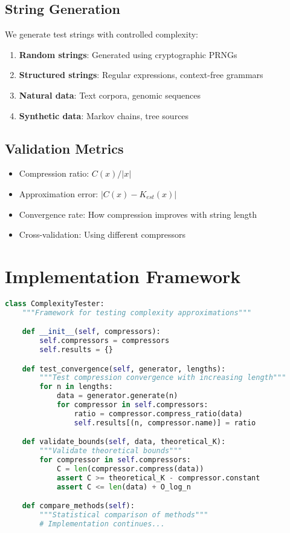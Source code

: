 \documentclass[12pt,a4paper]{report}
\begin{document}
\subsection{String Generation}

We generate test strings with controlled complexity:

\begin{enumerate}
    \item \textbf{Random strings}: Generated using cryptographic PRNGs
    \item \textbf{Structured strings}: Regular expressions, context-free grammars
    \item \textbf{Natural data}: Text corpora, genomic sequences
    \item \textbf{Synthetic data}: Markov chains, tree sources
\end{enumerate}

\subsection{Validation Metrics}

\begin{itemize}
    \item Compression ratio: $C(x)/|x|$
    \item Approximation error: $|C(x) - K_{est}(x)|$
    \item Convergence rate: How compression improves with string length
    \item Cross-validation: Using different compressors
\end{itemize}

\section{Implementation Framework}

\begin{lstlisting}[language=Python, caption=Testing Framework Structure]
class ComplexityTester:
    """Framework for testing complexity approximations"""

    def __init__(self, compressors):
        self.compressors = compressors
        self.results = {}

    def test_convergence(self, generator, lengths):
        """Test compression convergence with increasing length"""
        for n in lengths:
            data = generator.generate(n)
            for compressor in self.compressors:
                ratio = compressor.compress_ratio(data)
                self.results[(n, compressor.name)] = ratio

    def validate_bounds(self, data, theoretical_K):
        """Validate theoretical bounds"""
        for compressor in self.compressors:
            C = len(compressor.compress(data))
            assert C >= theoretical_K - compressor.constant
            assert C <= len(data) + O_log_n

    def compare_methods(self):
        """Statistical comparison of methods"""
        # Implementation continues...
\end{lstlisting}
\end{document}
